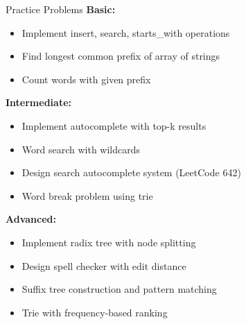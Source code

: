 \documentclass[aspectratio=169]{beamer}
\begin{document}
\begin{frame}{Practice Problems}
  \textbf{Basic:}
  \begin{itemize}
    \item Implement insert, search, starts\_with operations
    \item Find longest common prefix of array of strings
    \item Count words with given prefix
  \end{itemize}

  \vspace{0.3cm}
  \textbf{Intermediate:}
  \begin{itemize}
    \item Implement autocomplete with top-k results
    \item Word search with wildcards
    \item Design search autocomplete system (LeetCode 642)
    \item Word break problem using trie
  \end{itemize}

  \vspace{0.3cm}
  \textbf{Advanced:}
  \begin{itemize}
    \item Implement radix tree with node splitting
    \item Design spell checker with edit distance
    \item Suffix tree construction and pattern matching
    \item Trie with frequency-based ranking
  \end{itemize}
\end{frame}
\end{document}

